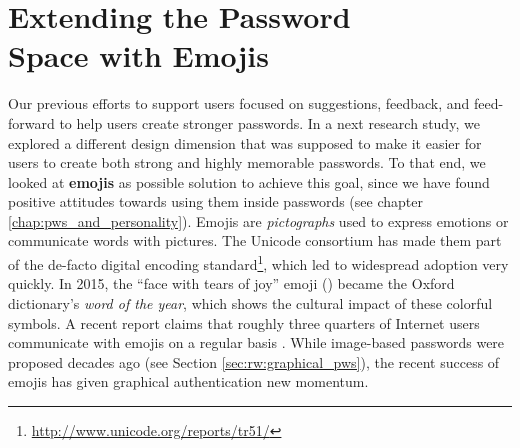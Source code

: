 \chapter[Extending the Password Space with Emojis]{Extending the Password \\ Space with Emojis}\label{chap:emojipasswords}



Our previous efforts to support users focused on suggestions, feedback, and feed-forward to help users create stronger passwords. In a next research study, we explored a different design dimension that was supposed to make it easier for users to create both strong and highly memorable passwords. To that end, we looked at \textbf{emojis} as possible solution to achieve this goal, since we have found positive attitudes towards using them inside passwords (see chapter \ref{chap:pws_and_personality}). Emojis are \textit{pictographs} used to express emotions or communicate words with pictures. The Unicode consortium has made them part of the de-facto digital encoding standard\footnote{\label{foot:emoji-standard}\url{http://www.unicode.org/reports/tr51/}}, which led to widespread adoption very quickly. In 2015, the ``face with tears of joy'' emoji () became the Oxford dictionary's \textit{word of the year}, which shows the cultural impact of these colorful symbols. A recent report claims that roughly three quarters of Internet users communicate with emojis on a regular basis \cite{EmogiResearch2016}. While image-based passwords were proposed decades ago (see Section \ref{sec:rw:graphical_pws}), the recent success of emojis has given graphical authentication new momentum. 

